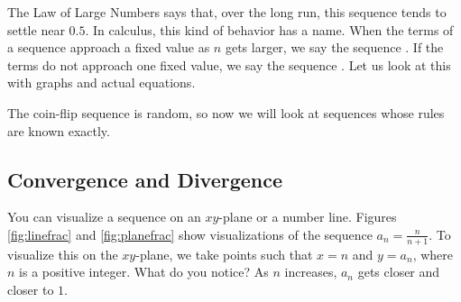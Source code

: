 The Law of Large Numbers says that, over the long run, this sequence tends to settle near \(0.5\). In calculus, this kind of behavior has a name. When the terms of a sequence approach a fixed value as \(n\) gets larger, we say the sequence . If the terms do not approach one fixed value, we say the sequence . Let us look at this with graphs and actual equations.

The coin-flip sequence is random, so now we will look at sequences whose rules are known exactly.
\subsection{Convergence and Divergence}
You can visualize a sequence on an $xy$-plane or a number line. Figures
\ref{fig:linefrac} and \ref{fig:planefrac} show visualizations of the sequence
$a_n = \frac{n}{n+1}$. To visualize this on the $xy$-plane, we take points such
that $x = n$ and $y = a_n$, where $n$ is a positive integer. What do you notice? As $n$ increases, $a_n$ gets closer and closer to $1$.


